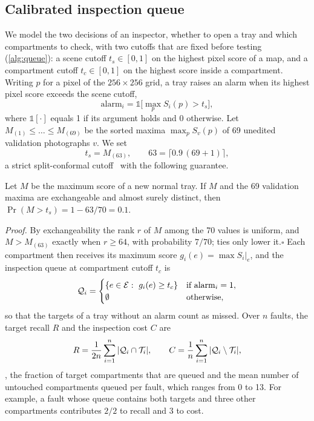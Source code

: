 \documentclass[10pt,twocolumn,letterpaper]{article}
\begin{document}
\subsection{Calibrated inspection queue}
\label{sec:queue}
We model the two decisions of an inspector, whether to open a tray and which compartments to check, with two cutoffs that are fixed before testing (\cref{alg:queue}): a scene cutoff $t_s\in[0,1]$ on the highest pixel score of a map, and a compartment cutoff $t_c\in[0,1]$ on the highest score inside a compartment. Writing $p$ for a pixel of the $256{\times}256$ grid, a tray raises an alarm when its highest pixel score exceeds the scene cutoff,
\begin{equation}
 \mathrm{alarm}_i=\mathbb{1}\bigl[\max_p S_i(p)>t_s\bigr],
 \label{eq:alarm}
\end{equation}
where $\mathbb{1}[\cdot]$ equals 1 if its argument holds and 0 otherwise. Let $M_{(1)}\le\dots\le M_{(69)}$ be the sorted maxima $\max_p S_v(p)$ of 69 unedited validation photographs $v$. We set
\begin{equation}
 t_s=M_{(63)},\qquad 63=\lceil 0.9\,(69+1)\rceil,
 \label{eq:ts}
\end{equation}
a strict split-conformal cutoff~\cite{bates2023} with the following guarantee.
\begin{proposition}
\label{prop:alarm}
Let $M$ be the maximum score of a new normal tray. If $M$ and the 69 validation maxima are exchangeable and almost surely distinct, then $\Pr(M>t_s)=1-63/70=0.1$.
\end{proposition}
\noindent\textit{Proof.} By exchangeability the rank $r$ of $M$ among the 70 values is uniform, and $M>M_{(63)}$ exactly when $r\ge64$, with probability $7/70$; ties only lower it.\hfill$\square$ Each compartment then receives its maximum score $g_i(e)=\max S_i|_e$, and the inspection queue at compartment cutoff $t_c$ is
\begin{equation}
 \mathcal{Q}_i=\begin{cases}\{e\in\mathcal{E}:\ g_i(e)\ge t_c\} & \text{if }\mathrm{alarm}_i=1,\\ \emptyset & \text{otherwise,}\end{cases}
 \label{eq:queue}
\end{equation}
so that the targets of a tray without an alarm count as missed. Over $n$ faults, the target recall $R$ and the inspection cost $C$ are
\begin{equation}
 R=\frac{1}{2n}\sum_{i=1}^n|\mathcal{Q}_i\cap\mathcal{T}_i|,\qquad
 C=\frac{1}{n}\sum_{i=1}^n|\mathcal{Q}_i\setminus\mathcal{T}_i|,
 \label{eq:rc}
\end{equation}
\ie, the fraction of target compartments that are queued and the mean number of untouched compartments queued per fault, which ranges from 0 to 13. For example, a fault whose queue contains both targets and three other compartments contributes $2/2$ to recall and $3$ to cost.
\end{document}
